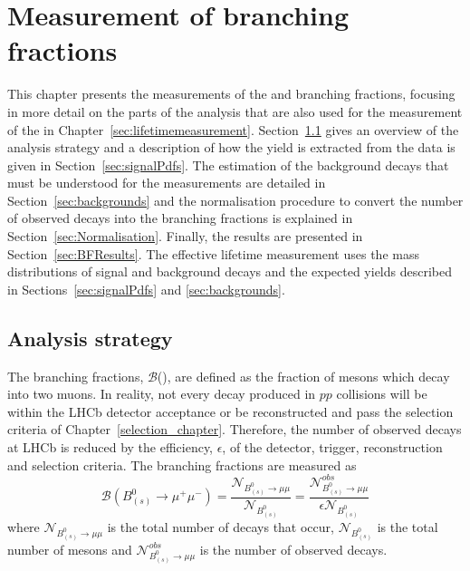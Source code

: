 \chapter{\bf{Measurement of }\boldmath{\bmumu}\bf{ branching fractions}}
\label{sec:BFanalysis}
This chapter presents the measurements of the \bdmumu and \bsmumu branching fractions, focusing in more detail on the parts of the analysis that are also used for the measurement of the \bsmumu \el in Chapter~\ref{sec:lifetimemeasurement}. Section~\ref{sec:BFAnalysisStrategy} gives an overview of the analysis strategy and a description of how the \bmumu yield is extracted from the data is given in Section~\ref{sec:signalPdfs}. The estimation of the background decays that must be understood for the \BF measurements are detailed in Section~\ref{sec:backgrounds} and the normalisation procedure to convert the number of observed \bmumu decays into the branching fractions is explained in Section~\ref{sec:Normalisation}. Finally, the results are presented in Section~\ref{sec:BFResults}. 
The \bsmumu effective lifetime measurement uses the mass distributions of signal and background decays and the expected yields described in Sections~\ref{sec:signalPdfs} and \ref{sec:backgrounds}. 

\section{Analysis strategy} 
\label{sec:BFAnalysisStrategy}
The \bmumu branching fractions, $\mathcal{B}$(\bmumu), are defined as the fraction of \bsd mesons which decay into two muons.
In reality, not every \bmumu decay produced in $pp$ collisions will be within the LHCb detector acceptance or be reconstructed and pass the selection criteria of Chapter~\ref{selection_chapter}. Therefore, the number of observed \bmumu decays at LHCb is reduced by the efficiency, $\epsilon$, of the detector, trigger, reconstruction and selection criteria.
The \bmumu branching fractions are measured as
\begin{equation}
\mathcal{B}(B^{0}_{(s)} \to \mu^{+} \mu^{-}) = \frac{\mathcal{N}_{B^{0}_{(s)} \to \mu \mu}}{\mathcal{N}_{B^{0}_{(s)}}} = \frac{ \mathcal{N}^{obs}_{B^{0}_{(s)} \to \mu \mu}}{ \epsilon \mathcal{N}_{B^{0}_{(s)}}}
\label{eq:BFdef}
\end{equation}
where $\mathcal{N}_{B^{0}_{(s)} \to \mu \mu}$ is the total number of \bmumu decays that occur, $\mathcal{N}_{B^{0}_{(s)}}$ is the total number of \bsd mesons and $\mathcal{N}^{obs}_{B^{0}_{(s)} \to \mu \mu}$ is the number of observed \bmumu decays.


